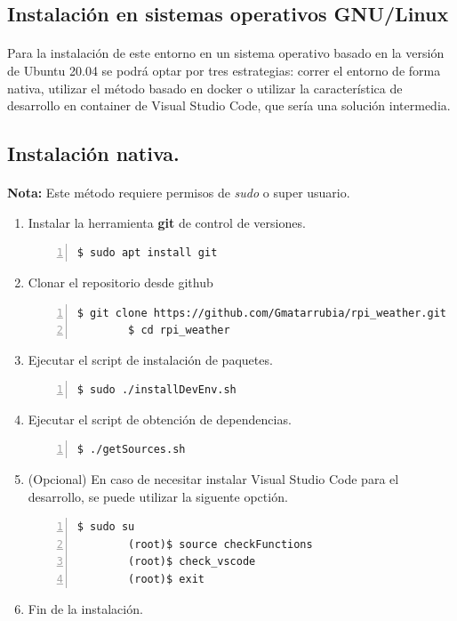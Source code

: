 \subsection{Instalación en sistemas operativos GNU/Linux}

\paragraph{}Para la instalación de este entorno en un sistema operativo basado en
la versión de Ubuntu 20.04 se podrá optar por tres estrategias: correr el entorno de
forma nativa, utilizar el método basado en docker o utilizar la característica de
desarrollo en container de Visual Studio Code, que sería una solución intermedia.

\subsection{Instalación nativa.}

\paragraph{}\textbf{Nota:} Este método requiere permisos de \emph{sudo} o super usuario.

\begin{enumerate}
    \item Instalar la herramienta \textbf{\gls{git}} de control de versiones.
    \begin{lstlisting}[style=consola, numbers=left]
        $ sudo apt install git
    \end{lstlisting}

    \item Clonar el repositorio desde github
    \begin{lstlisting}[style=consola, numbers=left]
        $ git clone https://github.com/Gmatarrubia/rpi_weather.git
        $ cd rpi_weather
    \end{lstlisting}

    \item Ejecutar el script de instalación de paquetes.
    \begin{lstlisting}[style=consola, numbers=left]
        $ sudo ./installDevEnv.sh
    \end{lstlisting}

    \item Ejecutar el script de obtención de dependencias.
    \begin{lstlisting}[style=consola, numbers=left]
        $ ./getSources.sh
    \end{lstlisting}

    \item (Opcional) En caso de necesitar instalar Visual Studio Code para el desarrollo,
    se puede utilizar la siguente opctión.
    \begin{lstlisting}[style=consola, numbers=left]
        $ sudo su
        (root)$ source checkFunctions
        (root)$ check_vscode
        (root)$ exit
    \end{lstlisting}

    \item Fin de la instalación.
\end{enumerate}

